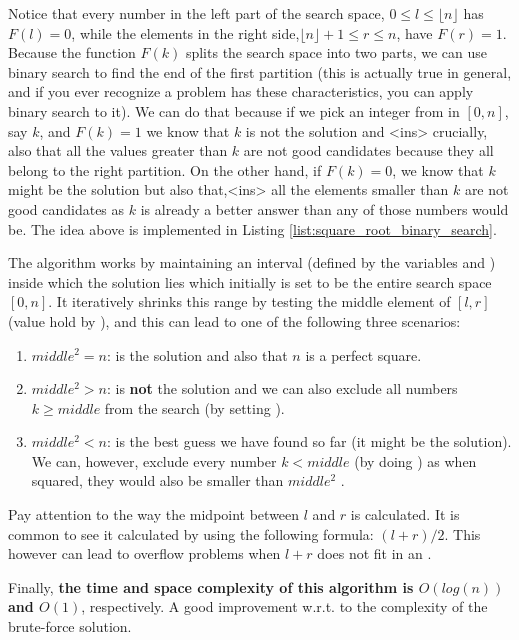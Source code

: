 Notice that every number in the left part of the search space, $0 \leq l \leq \lfloor n \rfloor$ has $F(l) = 0$, while the elements in the right side,$\lfloor n \rfloor+1 \leq r \leq n$, have $F(r) = 1$.
Because the function $F(k)$ splits the search space into two parts, we can use
binary search to find the end of the first partition (this is actually true in general, and if you ever recognize a problem has these characteristics, you can apply binary search to it). 
We can do that because if we pick an integer from in $[0,n]$, say $k$, and $F(k) = 1$ we know that $k$ is not the solution and 
<ins> crucially, also that
all the values greater than $k$ are not good candidates because they all belong to the right partition.
On the other hand, if $F(k) = 0$, we know that $k$ might be the solution but also that,<ins> all the elements smaller than $k$ are not good candidates as $k$ is already a better answer than any of those numbers would be.
The idea above is implemented in Listing \ref{list:square_root_binary_search}. 





The algorithm works by maintaining an interval (defined by the variables  and ) inside which the solution lies which initially is set to be the entire search space $[0,n]$.
It iteratively shrinks this range by 
 testing the middle element of $[l,r]$ (value hold by ), and this can lead to one of the following three scenarios:

 \begin{enumerate}
	 
	 \item $middle^2  = n$:  is the solution and also that $n$ is a perfect square.
	 \item $middle^2  > n$:  is \textbf{not} the solution and we can also exclude
	 all numbers $k \geq middle$ from the search (by setting ).
	 \item $middle^2  < n$:  is the best guess we have found so far (it might be the solution). We can, however, exclude every number $k < middle$ (by doing ) as when squared, they would also be smaller than $middle^2$ .

 \end{enumerate}


Pay attention to the way the midpoint between $l$ and $r$ is calculated. 
It is common to see it calculated by using the following formula: $(l+r)/2$.
This however can lead to overflow problems when $l+r$ does not fit in an .

Finally, \textbf{the time and space complexity of this algorithm is $O(log(n))$ and $O(1)$}, respectively. A good improvement w.r.t. to the complexity of the brute-force solution.


